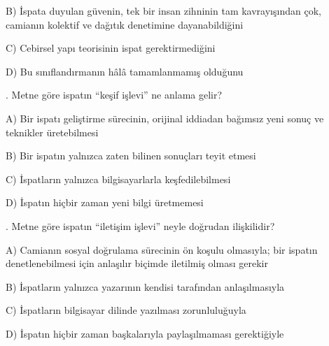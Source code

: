 \par\noindent\hspace*{1.6em}B) İspata duyulan güvenin, tek bir insan zihninin tam kavrayışından çok, camianın kolektif ve dağıtık denetimine dayanabildiğini

\par\noindent\hspace*{1.6em}C) Cebirsel yapı teorisinin ispat gerektirmediğini

\par\noindent\hspace*{1.6em}D) Bu sınıflandırmanın hâlâ tamamlanmamış olduğunu

\par\smallskip{}. Metne göre ispatın “keşif işlevi” ne anlama gelir?

\par\noindent\hspace*{1.6em}A) Bir ispatı geliştirme sürecinin, orijinal iddiadan bağımsız yeni sonuç ve teknikler üretebilmesi

\par\noindent\hspace*{1.6em}B) Bir ispatın yalnızca zaten bilinen sonuçları teyit etmesi

\par\noindent\hspace*{1.6em}C) İspatların yalnızca bilgisayarlarla keşfedilebilmesi

\par\noindent\hspace*{1.6em}D) İspatın hiçbir zaman yeni bilgi üretmemesi

\par\smallskip{}. Metne göre ispatın “iletişim işlevi” neyle doğrudan ilişkilidir?

\par\noindent\hspace*{1.6em}A) Camianın sosyal doğrulama sürecinin ön koşulu olmasıyla; bir ispatın denetlenebilmesi için anlaşılır biçimde iletilmiş olması gerekir

\par\noindent\hspace*{1.6em}B) İspatların yalnızca yazarının kendisi tarafından anlaşılmasıyla

\par\noindent\hspace*{1.6em}C) İspatların bilgisayar dilinde yazılması zorunluluğuyla

\par\noindent\hspace*{1.6em}D) İspatın hiçbir zaman başkalarıyla paylaşılmaması gerektiğiyle

